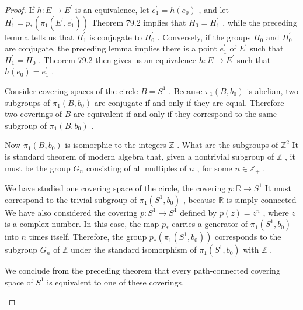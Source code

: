 \begin{proof}If \(h : E \rightarrow  {E}^{\prime }\) is an equivalence, let \({e}_{1}^{\prime } = h\left( {e}_{0}\right)\) , and let \({H}_{1}^{\prime } = {p}_{ * }\left( {{\pi }_{1}\left( {{E}^{\prime },{e}_{1}^{\prime }}\right) }\right)\) Theorem 79.2 implies that \({H}_{0} = {H}_{1}^{\prime }\) , while the preceding lemma tells us that \({H}_{1}^{\prime }\) is conjugate to \({H}_{0}^{\prime }\) .
Conversely, if the groups \({H}_{0}\) and \({H}_{0}^{\prime }\) are conjugate, the preceding lemma implies there is a point \({e}_{1}^{\prime }\) of \({E}^{\prime }\) such that \({H}_{1}^{\prime } = {H}_{0}\) . Theorem 79.2 then gives us an equivalence \(h : E \rightarrow  {E}^{\prime }\) such that \(h\left( {e}_{0}\right)  = {e}_{1}^{\prime }\) .

\begin{example} Consider covering spaces of the circle \(B = {S}^{1}\) . Because \({\pi }_{1}\left( {B,{b}_{0}}\right)\) is abelian, two subgroups of \({\pi }_{1}\left( {B,{b}_{0}}\right)\) are conjugate if and only if they are equal. Therefore two coverings of \(B\) are equivalent if and only if they correspond to the same subgroup of \({\pi }_{1}\left( {B,{b}_{0}}\right)\) .

Now \({\pi }_{1}\left( {B,{b}_{0}}\right)\) is isomorphic to the integers \(\mathbb{Z}\) . What are the subgroups of \({\mathbb{Z}}^{2}\) It is standard theorem of modern algebra that, given a nontrivial subgroup of \(\mathbb{Z}\) , it must be the group \({G}_{n}\) consisting of all multiples of \(n\) , for some \(n \in  {\mathbb{Z}}_{ + }\) .

We have studied one covering space of the circle, the covering \(p : \mathbb{R} \rightarrow  {S}^{1}\) It must correspond to the trivial subgroup of \({\pi }_{1}\left( {{S}^{1},{b}_{0}}\right)\) , because \(\mathbb{R}\) is simply connected We have also considered the covering \(p : {S}^{1} \rightarrow  {S}^{1}\) defined by \(p\left( z\right)  = {z}^{n}\) , where \(z\) is a complex number. In this case, the map \({p}_{ * }\) carries a generator of \({\pi }_{1}\left( {{S}^{1},{b}_{0}}\right)\) into \(n\) times itself. Therefore, the group \({p}_{ * }\left( {{\pi }_{1}\left( {{S}^{1},{b}_{0}}\right) }\right)\) corresponds to the subgroup \({G}_{n}\) of \(\mathbb{Z}\) under the standard isomorphism of \({\pi }_{1}\left( {{S}^{1},{b}_{0}}\right)\) with \(\mathbb{Z}\) .

We conclude from the preceding theorem that every path-connected covering space of \({S}^{1}\) is equivalent to one of these coverings.
\end{example}
\end{proof}
